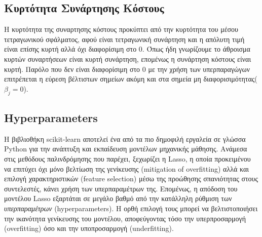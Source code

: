 \documentclass[12pt]{article}
\begin{document}
\subsection{Κυρτότητα Συνάρτησης Κόστους}
Η κυρτότητα της συναρτησης κόστους προκύπτει από την κυρτότητα του μέσου τετραγωνικού σφάλματος, αφού είναι τετραγωνική συνάρτηση και η απόλυτη τιμή είναι επίσης κυρτή αλλά όχι διαφορίσιμη στο 0. Όπως ήδη γνωρίζουμε το άθροισμα κυρτών συναρτήσεων είναι κυρτή συνάρτηση, επομένως η συνάρτηση κόστους είναι κυρτή. Παρόλο που δεν είναι διαφορίσιμη στο 0 με την χρήση των υπερπαραγώγων επιτρέπεται η εύρεση βέλτιστων σημείων ακόμη και στα σημεία μη διαφορισιμότητας($\beta_j = 0$).


\subsection{\textlatin{Hyperparameters}}
Η βιβλιοθήκη \textlatin{scikit-learn} αποτελεί ένα από τα πιο δημοφιλή εργαλεία σε γλώσσα Python για την ανάπτυξη και εκπαίδευση μοντέλων μηχανικής μάθησης. Ανάμεσα στις μεθόδους παλινδρόμησης που παρέχει, ξεχωρίζει η \textlatin{Lasso}, η οποία προκειμένου να επιτύχει όχι μόνο βελτίωση της γενίκευσης \textlatin{(mitigation of overfitting)} αλλά και επιλογή χαρακτηριστικών \textlatin{(feature selection)} μέσω της προώθησης σπανιότητας στους συντελεστές, κάνει χρήση των υπερπαραμέτρων της. Επομένως, η απόδοση του μοντέλου \textlatin{Lasso} εξαρτάται σε μεγάλο βαθμό από την κατάλληλη ρύθμιση των \emph{υπερπαραμέτρων} (\textlatin{hyperparameters}). Η ορθή επιλογή τους μπορεί να βελτιστοποιήσει την ικανότητα γενίκευσης του μοντέλου, αποφεύγοντας τόσο την υπερπροσαρμογή \textlatin{(overfitting)} όσο και την υποπροσαρμογή \textlatin{(underfitting)}.
\end{document}
